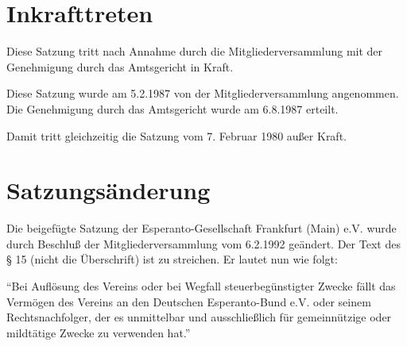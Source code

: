 \documentclass[11pt]{article}
\begin{document}
\section{Inkrafttreten}

Diese Satzung tritt nach Annahme durch die Mitgliederversammlung mit der Genehmigung durch das Amtsgericht in Kraft.

Diese Satzung wurde am 5.2.1987 von der Mitgliederversammlung angenommen. Die Genehmigung durch das Amtsgericht wurde am 6.8.1987 erteilt.

Damit tritt gleichzeitig die Satzung vom 7. Februar 1980 außer Kraft.

\section*{Satzungsänderung}

Die beigefügte Satzung der Esperanto-Gesellschaft Frankfurt (Main) e.V. wurde durch Beschluß der Mitgliederversammlung vom 6.2.1992 geändert. Der Text des § 15 (nicht die Überschrift) ist zu streichen. Er lautet nun wie folgt:

"`Bei Auflösung des Vereins oder bei Wegfall steuerbegünstigter Zwecke fällt das Vermögen des Vereins an den Deutschen Esperanto-Bund e.V. oder seinem Rechtsnachfolger, der es unmittelbar und ausschließlich für gemeinnützige oder mildtätige Zwecke zu verwenden hat."'
\end{document}
